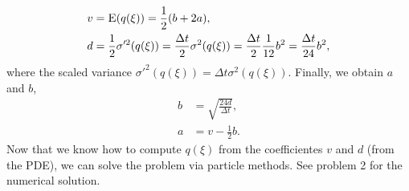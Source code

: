 \begin{questions}
\begin{solution}
\begin{align}
v &= \textsc{E}(q(\xi)) = \frac{1}{2}(b+2a),\\
d &= \frac{1}{2}\sigma'^2(q(\xi)) = \frac{\Delta t}{2}\sigma^2(q(\xi)) = \frac{\Delta t}{2}\frac{1}{12}b^2 = \frac{\Delta t}{24}b^2,
\end{align}
where the scaled variance $\sigma'^2(q(\xi)) = \Delta t\sigma^2(q(\xi))$. Finally, we obtain $a$ and $b$,
\begin{align}
b &= \sqrt{\frac{24d}{\Delta t}},\\
a &= v-\frac{1}{2}b.
\end{align}
Now that we know how to compute $q(\xi)$ from the coefficientes $v$ and $d$ (from the PDE), we can solve the problem via particle methods. See problem 2 for the numerical solution.
\end{solution}
\end{questions}